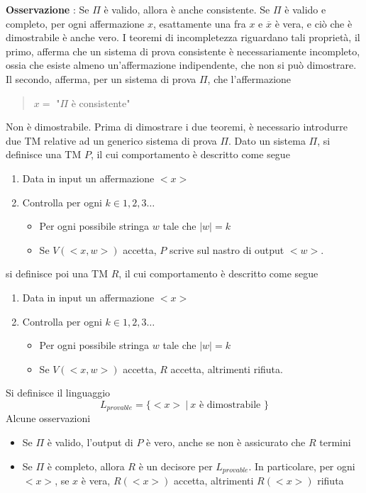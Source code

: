 \documentclass[10pt, letterpaper]{report}
\begin{document}
\textbf{Osservazione} : Se $\Pi$ è valido, allora è anche consistente. Se $\Pi$ è valido e completo, per ogni affermazione $x$, esattamente una fra $x$ e $\overline x$ è vera, e ciò che è dimostrabile è anche vero.\acc 
I teoremi di incompletezza riguardano tali proprietà, il primo, afferma che un sistema di prova consistente è necessariamente incompleto, ossia che esiste almeno un'affermazione indipendente, che non si può dimostrare. Il secondo, afferma, per un sistema di prova $\Pi$, che l'affermazione 
\begin{quote}
    $x=$ "$\Pi$ è consistente"
\end{quote}
Non è dimostrabile. Prima di dimostrare i due teoremi, è necessario introdurre due TM relative ad un generico sistema di prova $\Pi$. \acc 
{} Dato un sistema $\Pi$, si definisce una TM $P$, il cui comportamento è descritto come segue\begin{enumerate}
    \item Data in input un affermazione $<x>$
    \item Controlla per ogni $k\in 1,2,3\dots $\begin{itemize}
        \item Per ogni possibile stringa $w$ tale che $|w|=k$
        \item Se $V(<x,w>)$ accetta, $P$ scrive sul nastro di output $<w>$.
    \end{itemize}
\end{enumerate}
si definisce poi una TM $R$, il cui comportamento è descritto come segue\begin{enumerate}
    \item Data in input un affermazione $<x>$
    \item Controlla per ogni $k\in 1,2,3\dots $\begin{itemize}
        \item Per ogni possibile stringa $w$ tale che $|w|=k$
        \item Se $V(<x,w>)$ accetta, $R$ accetta, altrimenti rifiuta.
    \end{itemize}
\end{enumerate}
Si definisce il linguaggio 
$$ L_{provable}=\{<x>\ | \ x \text{ è dimostrabile }\}$$
Alcune osservazioni
\begin{itemize}
    \item Se $\Pi$ è valido, l'output di $P$ è vero, anche se non è assicurato che $R$ termini
    \item Se $\Pi$ è completo, allora $R$ è un decisore per $ L_{provable}$. In particolare, per ogni $<x>$, se $x$ è vera, $R(<x>)$ accetta, altrimenti $R(<x>)$ rifiuta
\end{itemize}
\end{document}
